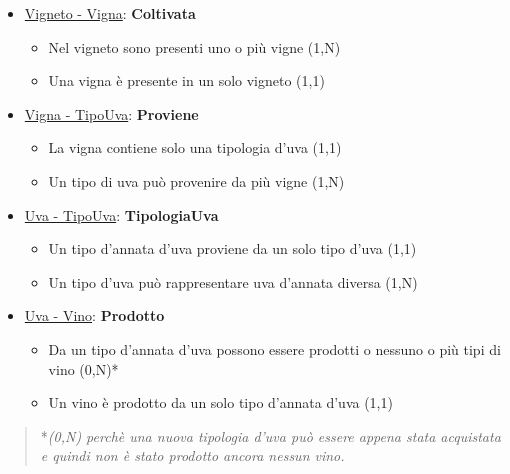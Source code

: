 \begin{itemize}
	\item \underline{Vigneto - Vigna}: \textbf{Coltivata}
	
	\begin{itemize}
		\item Nel vigneto sono presenti uno o più vigne (1,N)
		\item Una vigna è presente in un solo vigneto (1,1)
	\end{itemize}
	
\end{itemize}

\begin{itemize}
	\item \underline{Vigna - TipoUva}: \textbf{Proviene}
	
	\begin{itemize}
		\item La vigna contiene solo una tipologia d'uva (1,1)
		\item Un tipo di uva può provenire da più vigne (1,N)
	\end{itemize}
	
\end{itemize}

\begin{itemize}
	\item \underline{Uva - TipoUva}: \textbf{TipologiaUva}
	
	\begin{itemize}
		\item Un tipo d'annata d'uva proviene da un solo tipo d'uva (1,1)
		\item Un tipo d'uva può rappresentare uva d'annata diversa (1,N)
	\end{itemize}
	
\end{itemize}

\begin{itemize}
	\item \underline{Uva - Vino}: \textbf{Prodotto}
	
	\begin{itemize}
		\item Da un tipo d'annata d'uva possono essere prodotti o nessuno o più tipi di vino (0,N)*
		\item Un vino è prodotto da un solo tipo d'annata d'uva (1,1)
	\end{itemize}
	
\end{itemize}

\begin{verse}
	*\emph{(0,N) perchè una nuova tipologia d'uva può essere appena stata acquistata e quindi non è stato prodotto ancora nessun vino.}
\end{verse}


